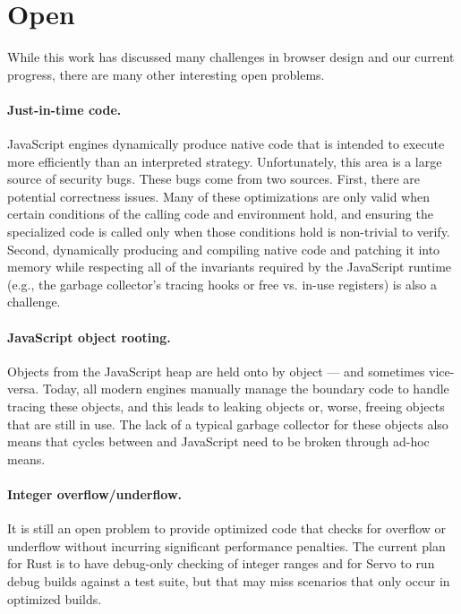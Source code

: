 
\section{Open}
\label{sec:open}
While this work has discussed many challenges in browser design and our current progress,
there are many other interesting open problems.

\paragraph{Just-in-time code.} JavaScript engines dynamically produce native code that is
intended to execute more efficiently than an interpreted strategy.
Unfortunately, this area is a large source of security bugs.
These bugs come from two sources.
First, there are potential correctness issues.
Many of these optimizations are only valid when certain conditions of the calling
code and environment hold, and ensuring the specialized code is called only when those
conditions hold is non-trivial to verify.
Second, dynamically producing and compiling native code and patching it into memory
while respecting all of the invariants required by the JavaScript runtime (e.g., the
garbage collector's tracing hooks or free vs. in-use registers) is also a challenge.

\paragraph{JavaScript object rooting.} Objects from the JavaScript
heap  are held onto by \Cplusplus{} object --- and sometimes vice-versa.
Today, all modern engines manually manage the boundary code to handle tracing
these objects, and this leads to leaking objects or, worse, freeing objects that
are still in use.
The lack of a typical garbage collector for these objects also means that cycles
between \Cplusplus{} and JavaScript need to be broken through ad-hoc means.

\paragraph{Integer overflow/underflow.} It is still an open problem
to provide optimized code that checks for overflow or underflow without
incurring significant performance penalties.
The current plan for Rust is to have debug-only checking of integer ranges
and for Servo to run debug builds against a test suite, but that may miss
scenarios that only occur in optimized builds.

